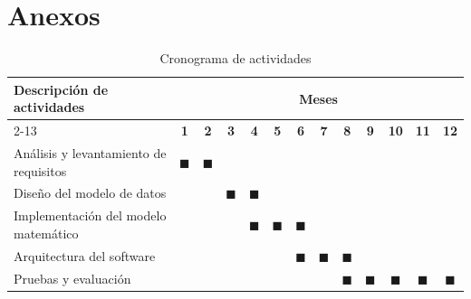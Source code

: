 \documentclass[12pt, letterpaper]{article}
\begin{document}
\printbibliography

\newpage
\appendix
\section{Anexos}

\begin{table}[h!]
    \centering
    \caption{Cronograma de actividades}
    \label{tab:cronograma}
    \small %
    \begin{tabular}{|p{3.2cm}|c|c|c|c|c|c|c|c|c|c|c|c|}
        \hline
        \textbf{Descripción de actividades} & \multicolumn{12}{c|}{\textbf{Meses}} \\
        \cline{2-13}
         & \textbf{1} & \textbf{2} & \textbf{3} & \textbf{4} & \textbf{5} & \textbf{6} & \textbf{7} & \textbf{8} & \textbf{9} & \textbf{10} & \textbf{11} & \textbf{12} \\
        \hline
        Análisis y levantamiento de requisitos & $\blacksquare$ & $\blacksquare$ & & & & & & & & & & \\
        \hline
        Diseño del modelo de datos & & & $\blacksquare$ & $\blacksquare$ & & & & & & & & \\
        \hline
        Implementación del modelo matemático & & & & $\blacksquare$ & $\blacksquare$ & $\blacksquare$ & & & & & & \\
        \hline
        Arquitectura del software & & & & & & $\blacksquare$ & $\blacksquare$ & $\blacksquare$ & & & & \\
        \hline
        Pruebas y evaluación & & & & & & & & $\blacksquare$ & $\blacksquare$ & $\blacksquare$ & $\blacksquare$ & $\blacksquare$ \\
        \hline
    \end{tabular}
\end{table}

\vspace{1cm}
\end{document}
